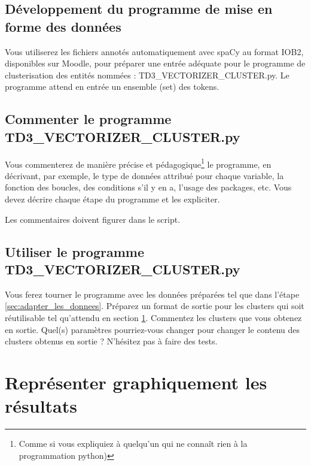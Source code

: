 \vspace{0.5cm}
\subsection{Développement du programme de mise en forme des données}
\vspace{0.5cm}
\label{sec:adapter_les_donnees}
Vous utiliserez les fichiers annotés automatiquement avec spaCy au format IOB2, disponibles sur Moodle, pour préparer une entrée adéquate pour le programme de clusterisation des entités nommées : TD3\_VECTORIZER\_CLUSTER.py. Le programme attend en entrée un ensemble (set) des tokens.


\subsection{Commenter le programme TD3\_VECTORIZER\_CLUSTER.py}

Vous commenterez de manière précise et pédagogique\footnote{Comme si vous expliquiez à quelqu'un qui ne connaît rien à la programmation python)} le programme, en décrivant, par exemple, le type de données attribué pour chaque variable, la fonction des boucles, des conditions s'il y en a, l'usage des packages, etc.
\newline
Vous devez décrire chaque étape du programme et les expliciter.
\newline

Les commentaires doivent figurer dans le script.

\subsection{Utiliser le programme TD3\_VECTORIZER\_CLUSTER.py}

Vous ferez tourner le programme avec les données préparées tel que dans l'étape \ref{sec:adapter_les_donnees}.
\newline
Préparez un format de sortie pour les clusters qui soit réutilisable tel qu'attendu en section \ref{sec:representation_graphique}.
\newline
Commentez les clusters que vous obtenez en sortie. Quel(s) paramètres pourriez-vous changer pour changer le contenu des clusters obtenus en sortie ? N'hésitez pas à faire des tests.
 
\section{Représenter graphiquement les résultats}
 \label{sec:representation_graphique}
 
